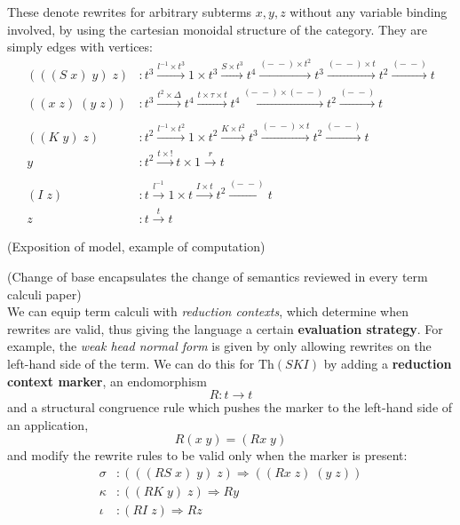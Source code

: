 \documentclass[a4paper,UKenglish]{article}
\theoremstyle{definition}
\newcommand{\Th}{\mathrm{Th}}
\begin{document}
These denote rewrites for arbitrary subterms $x, y, z$ without any variable binding involved, by using the cartesian monoidal structure of the category. They are simply edges with vertices:
\[\begin{array}{rl}
(((S\; x)\; y)\; z)&: t^3 \xrightarrow{l^{-1} \times t^3} 1\times t^3 \xrightarrow{S \times t^3} t^4 \xrightarrow{(-\;-)\times t^2} t^3 \xrightarrow{(-\;-) \times t} t^2 \xrightarrow{(-\;-)} t\\
((x\; z)\; (y\; z))&: t^3 \xrightarrow{t^2 \times \Delta} t^4 \xrightarrow{t \times \tau \times t} t^4 \xrightarrow{(-\;-) \times (-\;-)} t^2 \xrightarrow{(-\;-)} t\\\\
((K\; y)\; z)&: t^2 \xrightarrow{l^{-1} \times t^2} 1\times t^2 \xrightarrow{K \times t^2} t^3 \xrightarrow{(-\;-)\times t} t^2 \xrightarrow{(-\;-)} t\\
y&: t^2 \xrightarrow{t \times !} t \times 1 \xrightarrow{r} t\\\\
(I\; z)&: t \xrightarrow{l^{-1}} 1\times t \xrightarrow{I \times t} t^2 \xrightarrow{(-\;-)} t\\
z&: t \xrightarrow{t} t
\end{array}\]

(Exposition of model, example of computation)

(Change of base encapsulates the change of semantics reviewed in every term calculi paper)\\

We can equip term calculi with \textit{reduction contexts}, which determine when rewrites are valid, thus giving the language a certain \textbf{evaluation strategy}. For example, the \textit{weak head normal form} is given by only allowing rewrites on the left-hand side of the term. We can do this for $\Th(SKI)$ by adding a \textbf{reduction context marker}, an endomorphism $$R: t \to t$$ and a structural congruence rule which pushes the marker to the left-hand side of an application, $$R(x\; y) = (Rx\; y)$$ and modify the rewrite rules to be valid only when the marker is present: 
\[\begin{array}{rl}
\sigma & :(((RS\; x)\; y)\; z) \Rightarrow ((Rx\; z)\; (y\; z))\\
\kappa & :((RK\; y)\; z) \Rightarrow Ry\\
\iota & :(RI\; z) \Rightarrow Rz\\
\end{array}
\]
\end{document}
